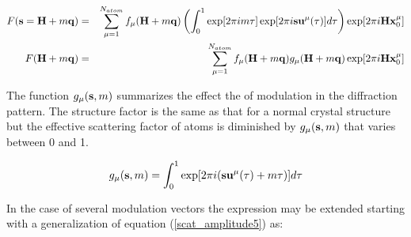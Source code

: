 \documentclass[10pt]{article}
\begin{document}
\begin{eqnarray} \label{scat_amplitude6}
F({\bf s}={\bf H}+m{\bf q}) &=&  \sum_{\mu=1}^{N_{atom}} f_{\mu}({\bf H}+m{\bf q}) \left (   \int_{0}^{1}   \exp[2 \pi i m \tau]  \exp [2 \pi i{\bf s}{\bf u}^{\mu}(\tau)] d\tau \right )   \exp[2 \pi i{\bf H} {\bf x}_0^{\mu}] \\
F({\bf H}+m{\bf q})&=& \sum_{\mu=1}^{N_{atom}} f_{\mu}({\bf H}+m{\bf q}) g_\mu({\bf H}+m{\bf q})   \exp[2 \pi i{\bf H} {\bf x}_0^{\mu}]
\end{eqnarray}

The function  $g_\mu({\bf s},m)$ summarizes the effect the of modulation in the diffraction pattern. The structure factor is the same as that for a normal crystal structure but the effective scattering factor of atoms is diminished by  $g_\mu({\bf s},m)$ that varies between 0 and 1.

\begin{equation} \label{modul_factor}
g_\mu({\bf s},m)=     \int_{0}^{1}  \exp [2 \pi i({\bf s}{\bf u}^{\mu}(\tau)+m\tau)] d\tau 
\end{equation}

In the case of several modulation vectors the expression may be extended starting with a generalization of equation (\ref{scat_amplitude5}) as:
\end{document}
